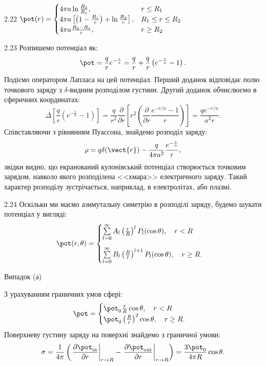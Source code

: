 \begin{Solution}{2.{22}}
	$
		\pot(r) =
		\begin{cases}
			4\pi a\ln\frac{R_2}{R_1},                                                  & r \le R_1         \\
			4\pi a \left[ \left( 1- \frac{R_1}{r}\right)  + \ln\frac{R_2}{r} \right] , & R_1 \le r \le R_2 \\
			4\pi a \frac{R_2 - R_1}{r},                                                & r \ge R_2
		\end{cases}
	$
\end{Solution}
\begin{Solution}{2.{23}}
	Розпишемо потенціал як:
    \[
	\pot = \frac{q}{r}e^{-\frac{r}{a}} = \frac{q}{r} +  \frac{q}{r}\left(e^{-\frac{r}{a}} - 1\right) .
    \]
    Подіємо оператором Лапласа на цей потенціал. Перший доданок відповідає полю точкового заряду з  $\delta$-видним розподілом густини. Другий доданок обчислюємо в сферичних координатах:
    \[
        \Delta \left[\frac{q}{r}\left(e^{-\frac{r}{a}} - 1\right) \right] =
    \frac{q}{r^2}\frac{\partial}{\partial r}\left[ r^2\left( \frac{\partial }{\partial r}\frac{e^{-r/a} - 1}{r} \right) \right] = \frac{qe^{-r/a}}{a^2r}.
    \]
	Співставляючи з рівнянням Пуассона, знайдемо розподіл заряду:
	\[
		\rho = q\delta(\vect{r}) - \frac{q}{4\pi a^2} \frac{e^{-\frac{r}{a}}}{r},
	\]
	звідки видно, що екранований кулонівський потенціал створюється точковим зарядом, навколо якого розподілена <<хмара>> електричного заряду. Такий характер розподілу зустрічається, наприклад, в електролітах, або плазмі.
\end{Solution}
\begin{Solution}{2.{24}}
	Оскільки ми маємо азимутальну симетрію в розподілі заряду, будемо шукати потенціал у вигляді:
	\begin{equation}
		\pot(r, \theta) = \begin{cases}
			\sum\limits_{l=0}^{\infty}A_l \left( \frac{r}{R}\right)^l P_l(\cos\theta), \quad r<R \\[1.5em]
			\sum\limits_{l=0}^{\infty}B_l \left( \frac{R}{l}\right)^{l+1} P_l(\cos\theta), \quad r \ge R.
		\end{cases}
	\end{equation}

	Випадок (а)

	З урахуванням граничних умов сфері:
	\begin{equation}
		\pot = \begin{cases}
			\pot_0\frac{r}{R} \cos\theta, \quad r<R \\
			\pot_0\left( \frac{R}{r}\right)^2 \cos\theta, \quad r \ge R.
		\end{cases}
	\end{equation}
	Поверхневу густину заряду на поверхні знайдемо з граничної умови:
	\begin{equation}
		\sigma = \frac{1}{4\pi} \left( \left. \frac{\partial \pot_{\mathrm{in}}}{\partial r}\right|_{r \to R} - \left. \frac{\partial \pot_{\mathrm{out}}}{\partial r}\right|_{r \to R} \right) =  \frac{3\pot_0}{4\pi R} \cos\theta.
	\end{equation}
\end{Solution}
